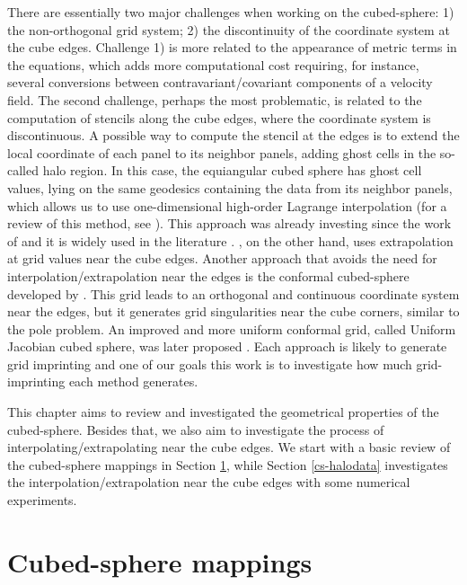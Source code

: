 	There are essentially two major challenges when working on the cubed-sphere:
1) the non-orthogonal grid system; 2) the discontinuity of the coordinate system
at the cube edges. Challenge 1) is more related to the appearance of metric terms
in the equations, which adds more computational cost requiring, for instance, several conversions
between contravariant/covariant components of a velocity field.
The second challenge, perhaps the most problematic, is related to the computation
of stencils along the cube edges, where the coordinate system is discontinuous.
A possible way to compute the stencil at the edges is to extend the local coordinate of 
each panel to its neighbor panels, adding ghost cells in the so-called halo region. 
In this case, the equiangular cubed sphere has ghost cell values, 
lying on the same geodesics containing the data from its neighbor panels,
which allows us to use one-dimensional high-order Lagrange interpolation (for a review of this method, see \citet{zerroukat:2022}).
This approach was already investing since the work of \citet{ronchi:1996}
and it is widely used in the literature \citep{Croisille:2013, katta:2015,Katta:2015b,chen:2021}.
\citet{putman:2007}, on the other hand, uses extrapolation
at grid values near the cube edges. Another approach that avoids the need for interpolation/extrapolation
near the edges is the conformal cubed-sphere developed by \citet{rancic:1996}. This grid
leads to an orthogonal and continuous coordinate system near the edges, but it generates grid singularities
near the cube corners, similar to the pole problem. An improved and more uniform conformal grid,
called Uniform Jacobian cubed sphere, was later proposed \citet{rancic:2017}.
Each approach is likely to generate grid imprinting and one of our goals
this work is to investigate how much grid-imprinting each method generates.

This chapter aims to review and investigated the geometrical properties
of the cubed-sphere. Besides that, we also aim to investigate the process
of interpolating/extrapolating near the cube edges.
We start with a basic review of the cubed-sphere mappings in Section \ref{cs-mappings},
while Section \ref{cs-halodata} investigates the interpolation/extrapolation near the cube edges
with some numerical experiments.

\section{Cubed-sphere mappings}
\label{cs-mappings}

